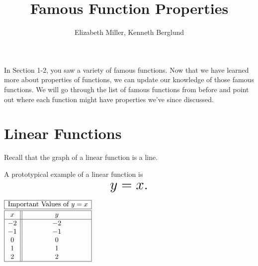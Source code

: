 \documentclass[nooutcomes]{ximera}
\author{Elizabeth Miller, Kenneth Berglund}
\title{Famous Function Properties}
\begin{document}
\begin{abstract}
\end{abstract}
\maketitle


In Section 1-2, you saw a variety of famous functions. Now that we have learned more about properties of functions, we can update our knowledge of those famous functions. We will go through the list of famous functions from before and point out where each function might have properties we've since discussed.

\newpage


\section{Linear Functions}
Recall that the graph of a linear function is a line. 

\begin{example}
A prototypical example of a linear function is $$ \mbox{\huge $y=x.$}$$ 

\begin{image}
\end{image}

\begin{center}
\(
\begin{array}{ |c || c|  }
 \hline
 \multicolumn{2}{|c|}{\text{\normalfont Important Values of } y=x} \\
\hline
 \hline
 x & y\\
 \hline
 -2&-2\\
 -1&-1\\
 0&0\\
 1&1\\
 2&2\\
 \hline
\end{array}
\)
\end{center}
\end{example}
\end{document}

